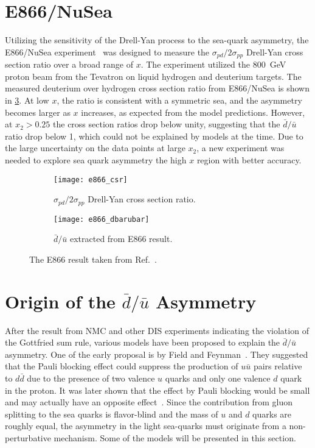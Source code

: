 \documentclass[../main.tex]{subfiles}
\begin{document}
\section{E866/NuSea}
\label{sec:E866}
Utilizing the sensitivity of the Drell-Yan process to the sea-quark asymmetry,
the E866/NuSea experiment~\cite{towell2001} was designed to measure the $\sigma_{pd}/2\sigma_{pp}$
Drell-Yan cross section ratio over a broad range of $x$. The
experiment utilized the \SI{800}{\GeV} proton beam from the Tevatron on liquid
hydrogen and deuterium targets. The measured deuterium over hydrogen cross section
ratio from E866/NuSea is shown in \cref{fig:e866_result}. At low $x$, the ratio is consistent
with a symmetric sea, and the asymmetry becomes larger as $x$ increases, as expected from
the model predictions. However, at $x_2>0.25$ the cross section ratios
drop below unity, suggesting that the $\bar{d}/\bar{u}$
ratio drop below 1, which could not be explained by models at the time.
Due to the large uncertainty on the data points at large $x_2$, a new
experiment was needed to explore sea quark asymmetry the high $x$ region with better
accuracy.
\begin{figure}[htbp!]
	\centering
	\begin{subfigure}{0.48\linewidth}
		\texttt{[image: e866\_csr]}
		\caption{$\sigma_{pd}/2\sigma_{pp}$ Drell-Yan cross section ratio.}
		\label{subfig:e866_csr}
	\end{subfigure}
	\begin{subfigure}{0.48\linewidth}
		\texttt{[image: e866\_dbarubar]}
		\caption{$\bar{d}/\bar{u}$ extracted from E866 result.}
		\label{subfig:e866_dbarubar}
	\end{subfigure}
	\caption{The E866 result taken from Ref.~\cite{towell2001}.}
	\label{fig:e866_result}
\end{figure}

\section{Origin of the \texorpdfstring{$\bar{d}/\bar{u}$}{dbar/ubar} Asymmetry }
After the result from NMC and other DIS experiments indicating the violation of the Gottfried sum rule,
various models have been proposed to explain the $\bar{d}/\bar{u}$ asymmetry. One of the early proposal
is by Field and Feynman~\cite{field1977}. They suggested that the Pauli blocking effect
could suppress the production of $u\bar{u}$ pairs relative to  $d\bar{d}$ due to the presence of two
valence $u$ quarks and only one valence $d$ quark in the proton.
It was later shown that the effect by Pauli blocking would be small and
may actually have an opposite effect~\cite{steffens1997}. Since the contribution from gluon splitting to the
sea quarks is flavor-blind and the mass of $u$ and $d$ quarks are roughly equal, the asymmetry in the
light sea-quarks must originate from a non-perturbative mechanism. Some of the models will be presented
in this section.
\end{document}
